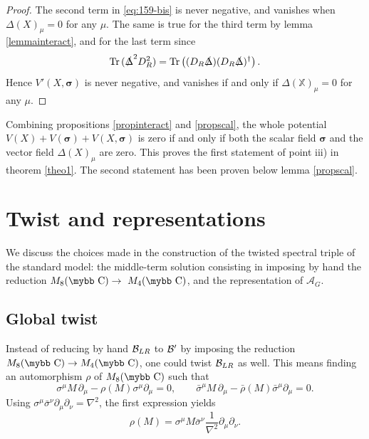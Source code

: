 \documentclass[11pt]{article}
\newcommand{\A}{\mathcal A}
\newcommand{\sig}{{\boldsymbol{\sigma}}}
\newcommand{\XX}{{\mathbb X}}
\def\bb#1{\hbox{\mybb#1}}
\begin{document}
\begin{proof}
The second term in \eqref{eq:159-bis} is never negative, and vanishes
when $\Delta(X)_\mu=0$ for any $\mu$.  The same is true for the third
term by lemma \ref{lemmainteract}, and for the last term since
\begin{equation}
  \label{eq:69}
  \text{Tr}\,(\slashed\Delta^2D_R^2)= \text{Tr}\left((D_R\slashed\Delta)(D_R\slashed\Delta)^\dagger\right).
\end{equation}
Hence $V'(X,\sig)$ is never negative, and vanishes if and only if
$\Delta(\XX)_\mu=0$ for any $\mu$.
\end{proof}
\medskip

Combining propositions \ref{propinteract} and \ref{propscal}, the whole potential $V(X) + V(\sig) + V(X, \sig)$ is zero if and
only if both the scalar field $\sig$ and the vector field
$\Delta(X)_\mu$ are zero. This proves the first statement of point iii) in theorem
\ref{theo1}. The second statement has been proven below lemma \ref{propscal}.
 
\section{Twist and representations}\setcounter{equation}{0}
\label{section:discussion}

We discuss the choices made in the construction of the twisted
spectral triple of the standard model: the middle-term solution consisting in imposing by hand
the reduction $M_8(\bb C)\to~M_4(\bb C)$, and the representation
of $\A_G$.

\subsection{Global twist}
\label{secdisc}

Instead of reducing by hand ${\cal B}_{LR}$ to $\cal B'$ by imposing the reduction
$M_8(\bb C) \to M_4(\bb C)$, one could twist ${\cal B}_{LR}$ as well. This means finding an automorphism $\rho$
of $M_8(\bb C)$ such that
\begin{equation}
\label{discussion1}
\sigma^{\mu} M\,\partial_{\mu}-\rho(M)\sigma^{\mu}\partial_{\mu} = 0,\quad\quad
\bar{\sigma}^{\mu} M\,\partial_{\mu}-\bar{\rho}(M)\bar{\sigma}^{\mu}\partial_{\mu}=0.
\end{equation}
Using 
$\sigma^{\mu}\bar{\sigma}^{\nu}\partial_{\mu}\partial_{\nu}=\nabla^{2}$,
the first expression yields
\begin{equation}
\rho(M)=\sigma^{\mu}M\bar{\sigma}^{\nu}\frac{1}{\nabla^{2}}\partial_{\mu}\partial_{\nu}.
\label{sigmaM def}
\end{equation}
\end{document}
